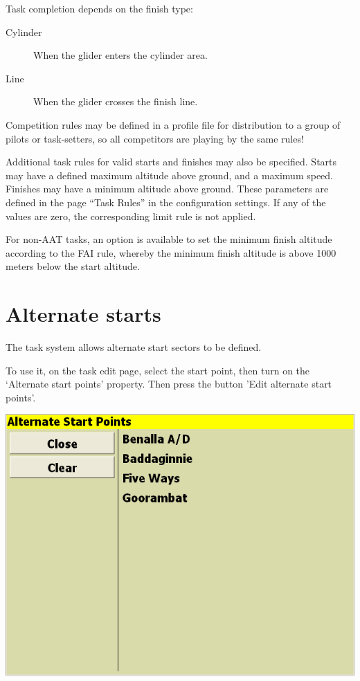\documentclass[a4paper,12pt]{refrep}
\begin{document}
Task completion depends on the finish type:
\begin{description}
\item[Cylinder] When the glider enters the cylinder area.
\item[Line] When the glider crosses the finish line.
\end{description}

\tip Competition rules may be defined in a profile file for
distribution to a group of pilots or task-setters, so all competitors
are playing by the same rules!

Additional task rules for valid starts and finishes may also be
specified.  Starts may have a defined maximum altitude above ground,
and a maximum speed.  Finishes may have a minimum altitude above
ground.  These parameters are defined in the page ``Task Rules'' in
the configuration settings.  If any of the values are zero, the
corresponding limit rule is not applied.

For non-AAT tasks, an option is available to set the minimum finish
altitude according to the FAI rule, whereby the minimum finish
altitude is above 1000 meters below the start altitude.

\section{Alternate starts}\label{sec:alternate-starts}

The task system allows alternate start sectors to be defined.
  
To use it, on the task edit page, select the start point, then turn on
the `Alternate start points' property.  Then press the button 'Edit
alternate start points'.

\begin{center}
\includegraphics[angle=0,width=\linewidth,keepaspectratio='true']{figures/dialog-startpoint2.png}
\end{center}
  
\end{document}
